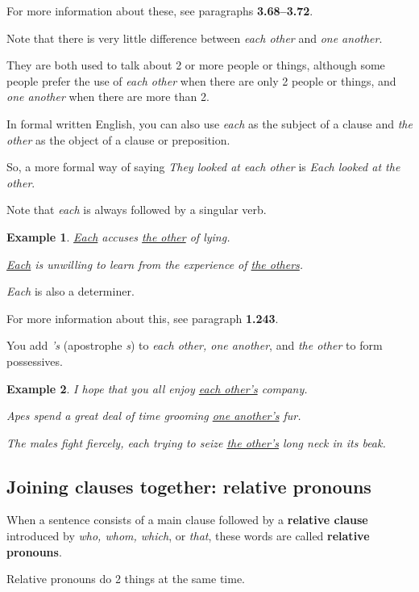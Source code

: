 \documentclass[oneside]{book}
\numberwithin{equation}{section}
\newtheorem{example}{Example}[section]
\begin{document}
For more information about these, see paragraphs \textbf{3.68--3.72}.

%
\noindent{} Note that there is very little difference between \textit{each other} and \textit{one another}.

They are both used to talk about 2 or more people or things, although some people prefer the use of \textit{each other} when there are only 2 people or things, and \textit{one another} when there are more than 2.

%
\noindent{} In formal written English, you can also use \textit{each} as the subject of a clause and \textit{the other} as the object of a clause or preposition.

So, a more formal way of saying \textit{They looked at each other} is \textit{Each looked at the other}.

Note that \textit{each} is always followed by a singular verb.
\begin{example}
    \underline{Each} accuses \underline{the other} of lying.
    
    \underline{Each} is unwilling to learn from the experience of \underline{the others}.
\end{example}
\textit{Each} is also a determiner.

For more information about this, see paragraph \textbf{1.243}.

%
\noindent{} You add \textit{'s} (apostrophe \textit{s}) to \textit{each other, one another}, and \textit{the other} to form possessives.
\begin{example}
    I hope that you all enjoy \underline{each other's} company.
    
    Apes spend a great deal of time grooming \underline{one another's} fur.
    
    The males fight fiercely, each trying to seize \underline{the other's} long neck in its beak.
\end{example}

\subsection{Joining clauses together: relative pronouns}
\noindent{} When a sentence consists of a main clause followed by a \textbf{relative clause} introduced by \textit{who, whom, which}, or \textit{that}, these words are called \textbf{relative pronouns}.

%
Relative pronouns do 2 things at the same time.
\end{document}
